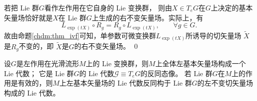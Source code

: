 \begin{example}\label{chlg:exm_ltmpa}
    若把 Lie 群$G$看作左作用在它自身的 Lie 变换群，
    则由$X \in T_e G$在$G$上决定的基本矢量场恰好就是$X$在
     Lie 群$G$上生成的右不变矢量场。实际上，有
    \begin{equation}
        L_{\exp (t X)} \circ R_g = R_g \circ L_{\exp (t X)},\qquad \forall g \in G.
    \end{equation}
    故由命题\ref{chdm:thm_ivf}可知，单参数可微变换群$L_{\exp(t X)}$所诱导的切矢量场
    $\widetilde{X}$是$R_{g}$不变的，即 $\widetilde{X}$是$G$的右不变矢量场。 \qed
\end{example}


\begin{theorem}\label{chlg:thm_liegaeb}
    设$G$是左作用在光滑流形$M$上的 Lie 变换群，则$M$上全体左基本矢量场构成一个 Lie 代数；
    它是 Lie 群$G$的 Lie 代数$\mathscr{G}\equiv T_e G$的{\kaishu 反}同态像。
    若 Lie 群$G$在$M$上的作用是有效的，则$M$上左基本矢量场的 Lie 代数{\kaishu 反}同构于
     Lie 群$G$的左不变切矢量场构成的 Lie 代数。
\end{theorem}


